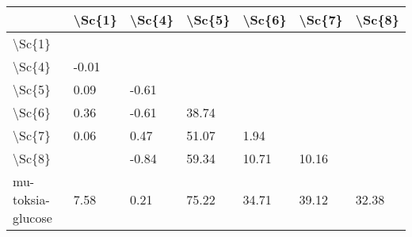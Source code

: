 \begin{tabular}{lllllll}
\toprule
{} & \textbackslash Sc\{1\} & \textbackslash Sc\{4\} & \textbackslash Sc\{5\} & \textbackslash Sc\{6\} & \textbackslash Sc\{7\} & \textbackslash Sc\{8\} \\
\midrule
\textbackslash Sc\{1\}            &        &        &        &        &        &        \\
\textbackslash Sc\{4\}            &  -0.01 &        &        &        &        &        \\
\textbackslash Sc\{5\}            &   0.09 &  -0.61 &        &        &        &        \\
\textbackslash Sc\{6\}            &   0.36 &  -0.61 &  38.74 &        &        &        \\
\textbackslash Sc\{7\}            &   0.06 &   0.47 &  51.07 &   1.94 &        &        \\
\textbackslash Sc\{8\}            &        &  -0.84 &  59.34 &  10.71 &  10.16 &        \\
mu-toksia-glucose &   7.58 &   0.21 &  75.22 &  34.71 &  39.12 &  32.38 \\
\bottomrule
\end{tabular}
